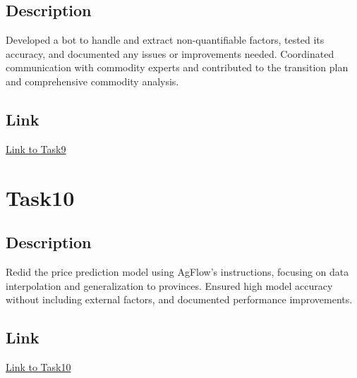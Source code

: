 \documentclass[12pt]{article}
\begin{document}
\subsection{Description}
Developed a bot to handle and extract non-quantifiable factors, tested its accuracy, and documented any issues or improvements needed. Coordinated communication with commodity experts and contributed to the transition plan and comprehensive commodity analysis.

\subsection{Link}
\href{https://github.com/msaadg/PAR-Project/tree/main/Task9}{Link to Task9}

\section{Task10}
\subsection{Description}
Redid the price prediction model using AgFlow's instructions, focusing on data interpolation and generalization to provinces. Ensured high model accuracy without including external factors, and documented performance improvements.

\subsection{Link}
\href{https://github.com/msaadg/PAR-Project/tree/main/Task10}{Link to Task10}
\end{document}
